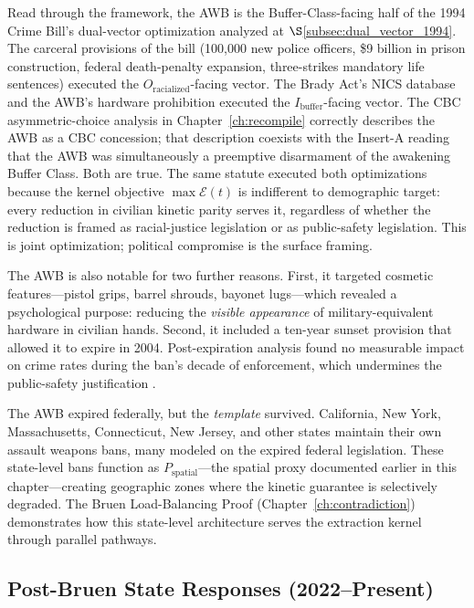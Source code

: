 Read through the framework, the AWB is the Buffer-Class-facing half of the 1994 Crime Bill's dual-vector optimization analyzed at $\S$\ref{subsec:dual_vector_1994}. The carceral provisions of the bill (100{,}000 new police officers, \$9 billion in prison construction, federal death-penalty expansion, three-strikes mandatory life sentences) executed the $O_{\text{racialized}}$-facing vector. The Brady Act's NICS database and the AWB's hardware prohibition executed the $I_{\text{buffer}}$-facing vector. The CBC asymmetric-choice analysis in Chapter~\ref{ch:recompile} correctly describes the AWB as a CBC concession; that description coexists with the Insert-A reading that the AWB was simultaneously a preemptive disarmament of the awakening Buffer Class. Both are true. The same statute executed both optimizations because the kernel objective $\max\mathcal{E}(t)$ is indifferent to demographic target: every reduction in civilian kinetic parity serves it, regardless of whether the reduction is framed as racial-justice legislation or as public-safety legislation. This is joint optimization; political compromise is the surface framing.

The AWB is also notable for two further reasons. First, it targeted cosmetic features---pistol grips, barrel shrouds, bayonet lugs---which revealed a psychological purpose: reducing the \textit{visible appearance} of military-equivalent hardware in civilian hands. Second, it included a ten-year sunset provision that allowed it to expire in 2004. Post-expiration analysis found no measurable impact on crime rates during the ban's decade of enforcement, which undermines the public-safety justification \cite{koper2004}.

The AWB expired federally, but the \textit{template} survived. California, New York, Massachusetts, Connecticut, New Jersey, and other states maintain their own assault weapons bans, many modeled on the expired federal legislation. These state-level bans function as $P_{\text{spatial}}$---the spatial proxy documented earlier in this chapter---creating geographic zones where the kinetic guarantee is selectively degraded. The Bruen Load-Balancing Proof (Chapter~\ref{ch:contradiction}) demonstrates how this state-level architecture serves the extraction kernel through parallel pathways.

\subsection{Post-Bruen State Responses (2022--Present)}

